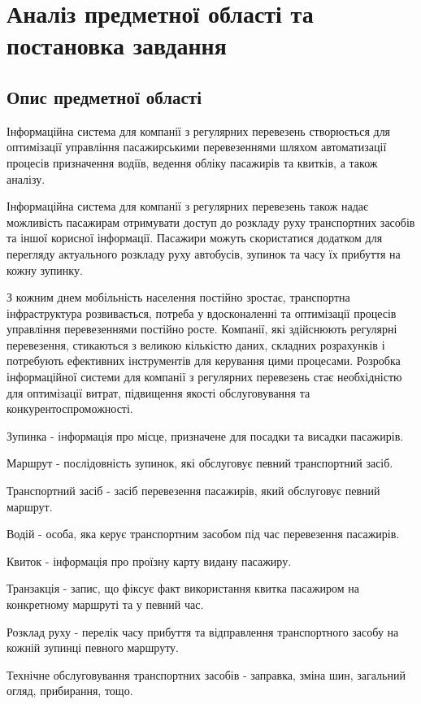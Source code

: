 \documentclass[oneside,14pt]{extarticle}
\begin{document}
\section{Аналіз предметної області та постановка завдання}
\subsection{Опис предметної області}
Інформаційна система для компанії з регулярних перевезень створюється для оптимізації управління пасажирськими перевезеннями шляхом автоматизації процесів призначення водіїв, ведення обліку пасажирів та квитків, а також аналізу.

Інформаційна система для компанії з регулярних перевезень також надає можливість пасажирам отримувати доступ до розкладу руху транспортних засобів та іншої корисної інформації. Пасажири можуть скористатися додатком для перегляду актуального розкладу руху автобусів, зупинок та часу їх прибуття на кожну зупинку.

З кожним днем мобільність населення постійно зростає, транспортна інфраструктура розвивається, потреба у вдосконаленні та оптимізації процесів управління перевезеннями постійно росте. Компанії, які здійснюють регулярні перевезення, стикаються з великою кількістю даних, складних розрахунків і потребують ефективних інструментів для керування цими процесами. Розробка інформаційної системи для компанії з регулярних перевезень стає необхідністю для оптимізації витрат, підвищення якості обслуговування та конкурентоспроможності.

\begin{list}{-}{Специфікація важливих понять:}
\item Зупинка - інформація про місце, призначене для посадки та висадки пасажирів.
\item Маршрут - послідовність зупинок, які обслуговує певний транспортний засіб.
\item Транспортний засіб - засіб перевезення пасажирів, який обслуговує певний маршрут.
\item Водій - особа, яка керує транспортним засобом під час перевезення пасажирів.
\item Квиток - інформація про проїзну карту видану пасажиру.
\item Транзакція - запис, що фіксує факт використання квитка пасажиром на конкретному маршруті та у певний час.
\item Розклад руху - перелік часу прибуття та відправлення транспортного засобу на кожній зупинці певного маршруту.
\item Технічне обслуговування транспортних засобів - заправка, зміна шин, загальний огляд, прибирання, тощо.
\end{list}
\end{document}
